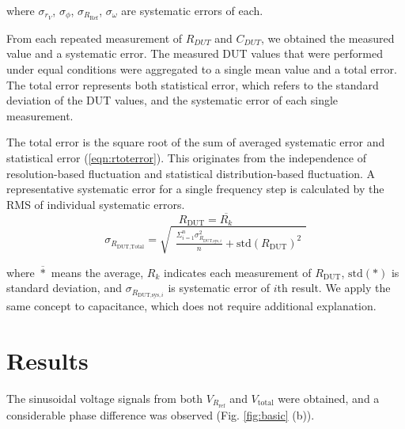 \documentclass[%
 aip,
 amsmath,amssymb,
 reprint,%
]{revtex4-1}
\begin{document}
\noindent where $\sigma_{r_V}$, $\sigma_{\phi}$, $\sigma_{R_{\textrm{Ref}}}$, $\sigma_{\omega}$ are systematic errors of each.

From each repeated measurement of $R_{DUT}$ and $C_{DUT}$, we obtained the measured value and a systematic error. The measured DUT values that were performed under equal conditions were aggregated to a single mean value and a total error. The total error represents both statistical error, which refers to the standard deviation of the DUT values, and the systematic error of each single measurement.

The total error is the square root of the sum of averaged systematic error and statistical error (\ref{eqn:rtoterror}). This originates from the independence of resolution-based fluctuation and statistical distribution-based fluctuation. A representative systematic error for a single frequency step is calculated by the RMS of individual systematic errors. 
\begin{equation}
R_{\textrm{DUT}} = \overline{R_{k}}
\end{equation}
\begin{equation}
\sigma_{R_{\textrm{DUT,Total}}} = \sqrt{
    \begin{aligned}
    \frac{\Sigma_{i = 1}^n\sigma_{R_{\textrm{DUT,sys},i}}^2}{n}
    +\text{std}(R_{\textrm{DUT}})^2
    \end{aligned}
    }\label{eqn:rtoterror}
\end{equation}

\noindent where $\overline{*}$ means the average, $R_{k}$ indicates each measurement of $R_{\textrm{DUT}}$, $\text{std}(*)$ is standard deviation, and $\sigma_{R_{\textrm{DUT,sys},i}}$ is systematic error of $i$th result. We apply the same concept to capacitance, which does not require additional explanation.

\section{\label{sec:Results} Results}
The sinusoidal voltage signals from both $V_{R_{\textrm{ref}}}$ and $V_{\textrm{total}}$ were obtained, and a considerable phase difference was observed (Fig. \ref{fig:basic} (b)).
\end{document}
